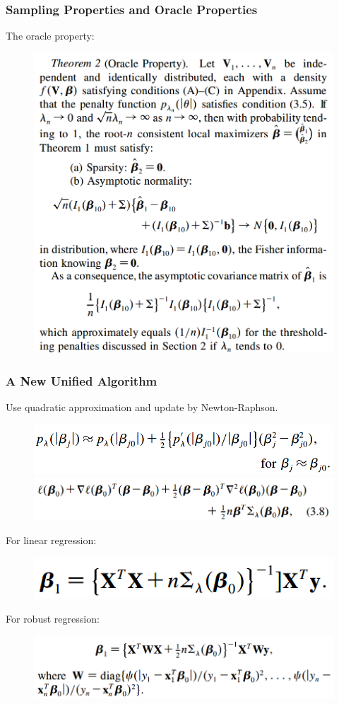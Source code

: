 \documentclass{beamer}
\begin{document}
	
	\begin{frame}
		\frametitle{Sampling Properties and Oracle Properties}
		The oracle property:
		\begin{figure}
			\includegraphics[width=0.6\linewidth]{image013.png}
		\end{figure}
		
	\end{frame}
	
	
	\begin{frame}
		\frametitle{A New Unified Algorithm}
		Use quadratic approximation and update by Newton-Raphson.
		\begin{figure}
			\includegraphics[width=0.6\linewidth]{image014.png}
			\includegraphics[width=0.6\linewidth]{image015.png}
		\end{figure}
		For linear regression:
		\begin{figure}
			\includegraphics[width=0.3\linewidth]{image016.png}
		\end{figure}
		For robust regression:
		\begin{figure}
			\includegraphics[width=0.6\linewidth]{image017.png}
		\end{figure}
	\end{frame}
	
\end{document}
